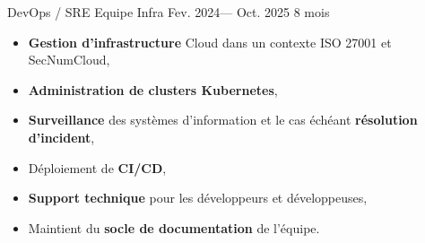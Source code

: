 \jobposition%
{DevOps / SRE}%
{Equipe Infra}%
{Fev. 2024--- Oct. 2025}%
{8 mois}%
{
	\begin{itemize}
		\item \textbf{Gestion d'infrastructure} Cloud dans un contexte ISO 27001 et
		      SecNumCloud,
		\item \textbf{Administration de clusters Kubernetes},
		\item \textbf{Surveillance} des systèmes d'information et le cas échéant
		      \textbf{résolution d'incident},
		\item Déploiement de \textbf{CI/CD},
		\item \textbf{Support technique} pour les développeurs et développeuses,
	  \item Maintient du \textbf{socle de documentation} de l'équipe.
	\end{itemize}
}
